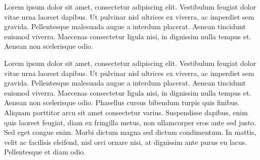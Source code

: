 \documentclass{article}
\begin{document}
\begin{pairs}  
\begin{Leftside} 
\beginnumbering  
\pstart  
Lorem ipsum dolor sit amet, consectetur adipiscing elit. Vestibulum feugiat dolor vitae urna laoreet dapibus. Ut pulvinar nisl ultrices ex viverra, ac imperdiet sem gravida. Pellentesque malesuada augue a interdum placerat. Aenean tincidunt euismod viverra. Maecenas consectetur ligula nisi, in dignissim nulla tempus et. Aenean non scelerisque odio. 
\pend  
\endnumbering
\end{Leftside} 

\begin{Rightside}   
\beginnumbering  
\pstart  
Lorem ipsum dolor sit amet, consectetur adipiscing elit. Vestibulum feugiat dolor vitae urna laoreet dapibus. Ut pulvinar nisl ultrices ex viverra, ac imperdiet sem gravida. Pellentesque malesuada augue a interdum placerat. Aenean tincidunt euismod viverra. Maecenas consectetur ligula nisi, in dignissim nulla tempus et. Aenean non scelerisque odio. Phasellus cursus bibendum turpis quis finibus. Aliquam porttitor arcu sit amet consectetur varius. Suspendisse dapibus, enim quis laoreet feugiat, diam ex fringilla metus, non ullamcorper eros ante sed justo. Sed eget congue enim. Morbi dictum magna sed dictum condimentum. In mattis, velit ac facilisis eleifend, nisl orci ornare nisi, at dignissim ante purus eu lacus. Pellentesque et diam odio.
\pend  
\endnumbering
\end{Rightside}  

\end{pairs}  
\Columns
%
\end{document}
